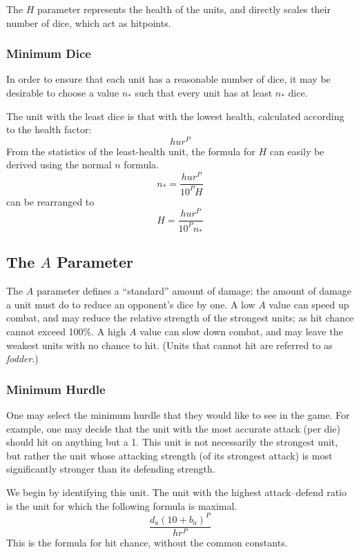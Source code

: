 \documentclass[twocolumn]{article}
\begin{document}
The $H$ parameter represents the health of the units,
and directly scales their number of dice, which act as hitpoints.

\subsubsection{Minimum Dice}

In order to ensure that each unit has a reasonable number of dice,
it may be desirable to choose a value $n_*$
such that every unit has at least $n_*$ dice.

The unit with the least dice is that with the lowest health,
calculated according to the health factor:
\[
    h u r^P
\]
From the statistics of the least-health unit, the formula for $H$
can easily be derived using the normal $n$ formula.
\[
    n_* =  
        \frac
            {h u r^P}
            {10^P H}
\]
can be rearranged to
\[
    H =  
        \frac
            {h u r^P}
            {10^P n_*}
\]


\subsection{The $A$ Parameter}


The $A$ parameter defines a ``standard'' amount of damage:
the amount of damage a unit must do to reduce an opponent's dice by one.
A low $A$ value can speed up combat,
and may reduce the relative strength of the strongest units;
as hit chance cannot exceed 100\%.
A high $A$ value can slow down combat,
and may leave the weakest units with no chance to hit.
(Units that cannot hit are referred to as \emph{fodder}.)

\subsubsection{Minimum Hurdle}

One may select the minimum hurdle that they would like to see in the game.
For example, one may decide
that the unit with the most accurate attack (per die)
should hit on anything but a 1.
This unit is not necessarily the strongest unit,
but rather the unit whose attacking strength (of its strongest attack)
is most significantly stronger than
its defending strength.

We begin by identifying this unit.
The unit with the highest attack--defend ratio is the unit for which the following formula is maximal.
\[
    \frac
        {d_a (10 + b_a)^P}
        {h r^P}
\]
This is the formula for hit chance, without the common constants.
\end{document}
